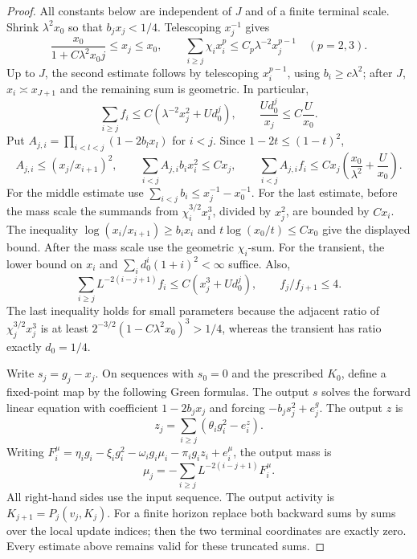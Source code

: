 \documentclass[11pt]{article}
\begin{document}
\begin{proof}
All constants below are independent of \(J\) and of a finite terminal
scale.  Shrink \(\lambda^2x_0\) so that \(b_jx_j<1/4\).
Telescoping \(x_j^{-1}\) gives
\[
 \frac{x_0}{1+C\lambda^2x_0j}\le x_j\le x_0,
 \qquad
 \sum_{i\ge j}\chi_i x_i^p\le C_p\lambda^{-2}x_j^{p-1}
 \quad(p=2,3).
\]
Up to \(J\), the second estimate follows by telescoping
\(x_i^{p-1}\), using \(b_i\ge c\lambda^2\); after \(J\),
\(x_i\asymp x_{J+1}\) and the remaining sum is geometric.
In particular,
\begin{equation}\label{eq:recursion-tail-estimates}
 \sum_{i\ge j}f_i\le C(\lambda^{-2}x_j^2+Ud_0^j),
 \qquad \frac{Ud_0^j}{x_j}\le C\frac U{x_0}.
\end{equation}
Put \(A_{j,i}=\prod_{i<l<j}(1-2b_lx_l)\) for \(i<j\).
Since \(1-2t\le(1-t)^2\),
\[
 A_{j,i}\le(x_j/x_{i+1})^2,
 \qquad
 \sum_{i<j}A_{j,i}b_ix_i^2\le Cx_j,
 \qquad
 \sum_{i<j}A_{j,i}f_i
 \le Cx_j\left(\frac{x_0}{\lambda^2}+\frac U{x_0}\right).
\]
For the middle estimate use
\(\sum_{i<j}b_i\le x_j^{-1}-x_0^{-1}\).
For the last estimate, before the mass scale the summands from
\(\chi_i^{3/2}x_i^3\), divided by \(x_j^2\), are bounded by
\(Cx_i\).  The inequality
\(\log(x_i/x_{i+1})\ge b_ix_i\) and
\(t\log(x_0/t)\le Cx_0\) give the displayed bound.
After the mass scale use the geometric \(\chi_i\)-sum.  For the
transient, the lower bound on \(x_i\) and
\(\sum_i d_0^i(1+i)^2<\infty\) suffice.  Also,
\begin{equation}\label{eq:recursion-geometric-estimate}
 \sum_{i\ge j}L^{-2(i-j+1)}f_i
 \le C(x_j^3+Ud_0^j),
 \qquad f_j/f_{j+1}\le4.
\end{equation}
The last inequality holds for small parameters because the adjacent
ratio of \(\chi_j^{3/2}x_j^3\) is at least
\(2^{-3/2}(1-C\lambda^2x_0)^3>1/4\), whereas the transient
has ratio exactly \(d_0=1/4\).

Write \(s_j=g_j-x_j\).  On sequences with \(s_0=0\) and the
prescribed \(K_0\), define a fixed-point map by the following Green
formulas.  The output \(s\) solves the forward linear equation with
coefficient \(1-2b_jx_j\) and forcing
\(-b_js_j^2+e_j^g\).  The output \(z\) is
\[
 z_j=\sum_{i\ge j}(\theta_i g_i^2-e_i^z).
\]
Writing
\(F_i^\mu=\eta_i g_i-\xi_i g_i^2-
\omega_i g_i\mu_i-\pi_i g_i z_i+e_i^\mu\), the output mass is
\[
 \mu_j=-\sum_{i\ge j}L^{-2(i-j+1)}F_i^\mu .
\]
All right-hand sides use the input sequence.  The output activity is
\(K_{j+1}=P_j(v_j,K_j)\).  For a finite horizon replace both
backward sums by sums over the local update indices; then the two
terminal coordinates are exactly zero.  Every estimate above remains
valid for these truncated sums.


\end{proof}
\end{document}
